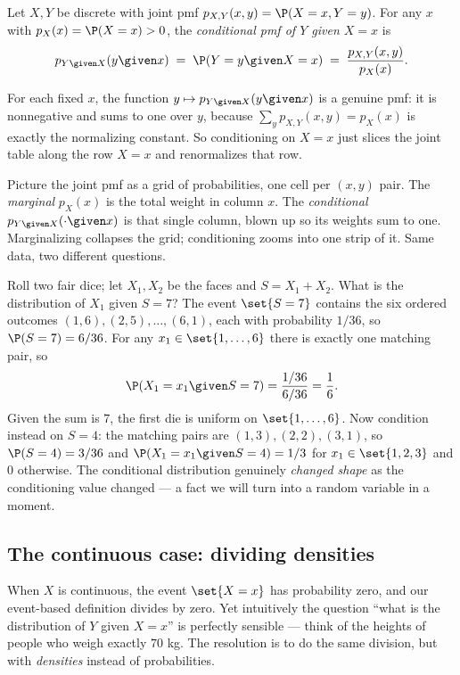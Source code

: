 \begin{definition}
\label{ch15:def-cond-pmf}
Let $X, Y$ be discrete with joint pmf $p_{X,Y}(x,y) = \P(X = x, Y = y)$. For any $x$ with
$p_X(x) = \P(X=x) > 0$, the \emph{conditional pmf of $Y$ given $X = x$} is
\[
  p_{Y \given X}(y \given x) \;=\; \P(Y = y \given X = x)
  \;=\; \frac{p_{X,Y}(x,y)}{p_X(x)}.
\]
\end{definition}

For each fixed $x$, the function $y \mapsto p_{Y \given X}(y \given x)$ is a genuine pmf: it is
nonnegative and sums to one over $y$, because $\sum_y p_{X,Y}(x,y) = p_X(x)$ is exactly the
normalizing constant. So conditioning on $X=x$ just slices the joint table along the row $X=x$ and
renormalizes that row.

\begin{intuitionbox}
Picture the joint pmf as a grid of probabilities, one cell per $(x,y)$ pair. The \emph{marginal}
$p_X(x)$ is the total weight in column $x$. The \emph{conditional} $p_{Y\given X}(\cdot \given x)$ is
that single column, blown up so its weights sum to one. Marginalizing collapses the grid; conditioning
zooms into one strip of it. Same data, two different questions.
\end{intuitionbox}

\begin{example}
\label{ch15:ex-two-dice}
Roll two fair dice; let $X_1, X_2$ be the faces and $S = X_1 + X_2$. What is the distribution of
$X_1$ given $S = 7$? The event $\set{S=7}$ contains the six ordered outcomes
$(1,6),(2,5),\dots,(6,1)$, each with probability $1/36$, so $\P(S=7) = 6/36$. For any
$x_1 \in \set{1,\dots,6}$ there is exactly one matching pair, so
\[
  \P(X_1 = x_1 \given S = 7) = \frac{1/36}{6/36} = \frac{1}{6}.
\]
Given the sum is $7$, the first die is uniform on $\set{1,\dots,6}$. Now condition instead on $S=4$:
the matching pairs are $(1,3),(2,2),(3,1)$, so $\P(S=4) = 3/36$ and
$\P(X_1 = x_1 \given S=4) = 1/3$ for $x_1 \in \set{1,2,3}$ and $0$ otherwise. The conditional
distribution genuinely \emph{changed shape} as the conditioning value changed --- a fact we will turn
into a random variable in a moment.
\end{example}

\subsection{The continuous case: dividing densities}
When $X$ is continuous, the event $\set{X=x}$ has probability zero, and our event-based definition
divides by zero. Yet intuitively the question ``what is the distribution of $Y$ given $X = x$'' is
perfectly sensible --- think of the heights of people who weigh exactly $70$ kg. The resolution is to
do the same division, but with \emph{densities} instead of probabilities.

